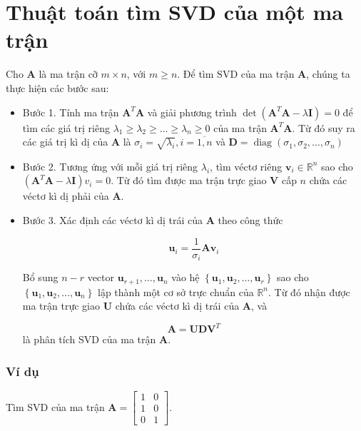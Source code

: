 \documentclass[12pt,a4paper,oneside]{report}
\numberwithin{equation}{section}
\begin{document}
\section{Thuật toán tìm SVD của một ma trận}
Cho $\mathbf{A}$ là ma trận cỡ $m \times n$, với $m \geq n$. Để tìm $\mathrm{SVD}$ của ma trận $\mathbf{A}$, chúng ta thực hiện các bước sau:
\begin{itemize}

 \item Bước 1. Tính ma trận $\mathbf{A}^{T} \mathbf{A}$ và giải phương trình $\operatorname{det}\left(\mathbf{A}^{T} \mathbf{A}-\lambda \mathbf{I}\right)=0$ để tìm các giá trị riêng $\lambda_{1} \geq \lambda_{2} \geq \ldots \geq \lambda_{n} \geq 0$ của ma trận $\mathbf{A}^{T} \mathbf{A}$. Từ đó suy ra các giá trị kì dị của $\mathbf{A}$ là $\sigma_{i}=\sqrt{\lambda_{i}}, i=\overline{1, n}$ và $\mathbf{D}=\operatorname{diag}\left(\sigma_{1}, \sigma_{2}, \ldots, \sigma_{n}\right)$

\item Bước 2. Tương ứng với mỗi giá trị riêng $\lambda_{i}$, tìm véctơ riêng $\mathbf{v}_{i} \in \mathbb{R}^{n}$ sao cho $\left(\mathbf{A}^{T} \mathbf{A}-\lambda \mathbf{I}\right) v_{i}=0$. Từ đó tìm được ma trận trực giao $\mathbf{V}$ cấp $n$ chứa các véctơ kì dị phải của $\mathbf{A}$.

\item Bước 3. Xác định các véctơ kì dị trái của $\mathbf{A}$ theo công thức

$$
\mathbf{u}_{i}=\frac{1}{\sigma_{i}} \mathbf{A} \mathbf{v}_{i}
$$

Bổ sung $n-r$ vector $\mathbf{u}_{r+1}, \ldots, \mathbf{u}_{n}$ vào hệ $\left\{\mathbf{u}_{1}, \mathbf{u}_{2}, \ldots, \mathbf{u}_{r}\right\}$ sao cho $\left\{\mathbf{u}_{1},\mathbf{u}_{2}, \ldots, \mathbf{u}_{n}\right\}$ lập thành một cơ sở trực chuẩn của $\mathbb{R}^{n}$. Từ đó nhận được ma trận trực giao $\mathbf{U}$ chứa các véctơ kì dị trái của $\mathbf{A}$, và

$$
\mathbf{A}=\mathbf{U D V}^{T}
$$
là phân tích SVD của ma trận $\mathbf{A}$.
\end{itemize}
\subsubsection{Ví dụ}

Tìm SVD của ma trận $\mathbf{A}=\left[\begin{array}{ll}1 & 0 \\ 1 & 0 \\ 0 & 1\end{array}\right]$.
\end{document}

